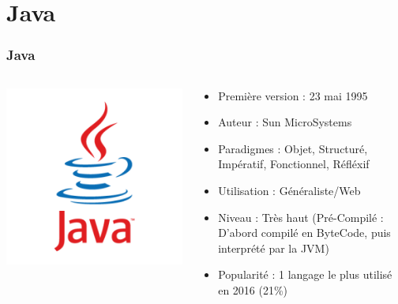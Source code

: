 \documentclass{beamer}
\begin{document}
	\section{Java}
	\begin{frame}
	\frametitle{Java}
	\begin{columns}

	\begin{column}{3cm}
						\includegraphics[scale=0.2]{java.png}
	\end{column}

	\begin{column}{7cm}
		\begin{itemize}
			\item Première version : 23 mai 1995
			\item Auteur : Sun MicroSystems
			\item Paradigmes : Objet, Structuré, Impératif, Fonctionnel, Réfléxif
			\item Utilisation : Généraliste/Web
			\item Niveau : Très haut (Pré-Compilé : D'abord compilé en ByteCode, puis interprété par la JVM)
			\item Popularité : 1 langage le plus utilisé en 2016 (21\%)
		\end{itemize}
	\end{column}
	\end{columns}

	\end{frame}	
	
\end{document}
